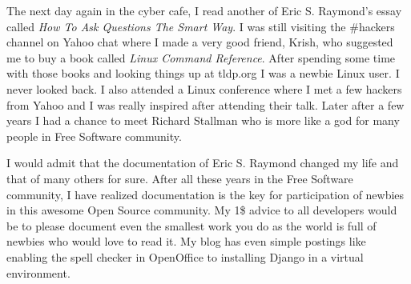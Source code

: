 The next day again in the cyber cafe, I read another of Eric S. Raymond's essay
called \textit{How To Ask Questions The Smart Way}. I was still visiting the \#hackers channel on
Yahoo chat where I made a very good friend, Krish, who suggested me to
buy a book called \textit{Linux Command Reference}. After spending some time
with those books and looking things up at tldp.org I was a newbie
Linux user. I never looked back. I also attended a Linux conference
where I met a few hackers from Yahoo and I was really inspired after
attending their talk. Later after a few years I had a chance to meet Richard Stallman
who is more like a god for many people in Free Software community.

I would admit that the documentation of Eric S. Raymond changed my life and that of
many others for sure. After all these years in the Free Software
community, I have realized documentation is the key for participation
of newbies in this awesome Open Source community. My 1\$ advice to all
developers would be to please document even the smallest work you do as the world
is full of newbies who would love to read it. My blog has even simple
postings like enabling the spell checker in OpenOffice to installing Django
in a virtual environment.
